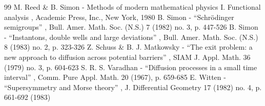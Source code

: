 \begin{thebibliography}{99}
 M. Reed \& B. Simon - Methods of modern mathematical physics I. Functional analysis , Academic Press, Inc., New York, 1980
 B. Simon - “Schrödinger semigroups” , Bull. Amer. Math. Soc. (N.S.) 7 (1982) no. 3, p. 447-526
 B. Simon - “Instantons, double wells and large deviations” , Bull. Amer. Math. Soc. (N.S.) 8 (1983) no. 2, p. 323-326
 Z. Schuss \& B. J. Matkowsky - “The exit problem: a new approach to diffusion across potential barriers” , SIAM J. Appl. Math. 36 (1979) no. 3, p. 604-623
 S. R. S. Varadhan - “Diffusion processes in a small time interval” , Comm. Pure Appl. Math. 20 (1967), p. 659-685
 E. Witten - “Supersymmetry and Morse theory” , J. Differential Geometry 17 (1982) no. 4, p. 661-692 (1983)
\end{thebibliography}
